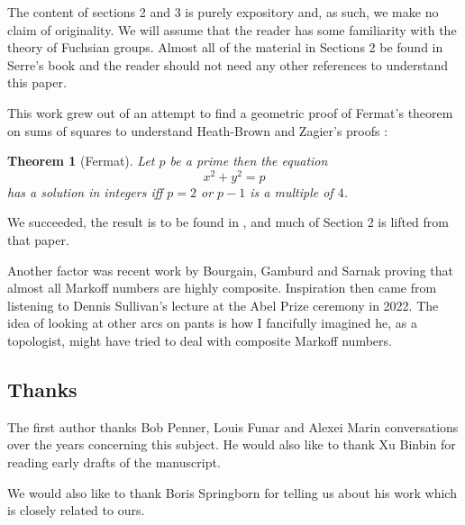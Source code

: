 \documentclass[12pt,a4paper]{amsart}
\newtheorem{thm}{Theorem}[section]
\begin{document}
The content of sections 2 and 3 is purely expository and, as such, we make no
claim of originality. We will assume that the reader has some familiarity with
the theory of Fuchsian groups. Almost all  of the material in Sections 2 be
found in Serre's book \cite{serre} and the reader should not need any other
references to understand this paper. 

This work grew out of an attempt to find a geometric proof of Fermat's theorem
on sums of squares to understand Heath-Brown and Zagier's proofs \cite{zagier}:

 \begin{thm}[Fermat]
 Let $p$ be a prime then the equation
 $$x^2 + y^2 = p $$
 has a solution in integers  iff  $p =2$ or $p-1$ is a multiple of $4$.
 \end{thm}

 \noindent We succeeded, the result is to be found in \cite{squares}, and much
 of Section 2 is lifted from that paper.

Another factor was recent work by Bourgain, Gamburd and Sarnak proving that
almost all Markoff numbers are highly composite. Inspiration then  came from
listening to Dennis Sullivan's lecture at the Abel Prize ceremony in 2022. The
idea of looking at other arcs on pants is how I fancifully imagined he, as a
topologist, might have tried to deal with composite Markoff numbers.


 

\subsection{Thanks}

The first author thanks Bob Penner, Louis Funar and Alexei Marin
conversations over the years concerning this subject. He would also like to
thank Xu Binbin for reading early drafts of the manuscript.

We would also like to thank Boris Springborn  for telling us about his work
\cite{spring} which is closely related to ours.
\end{document}
